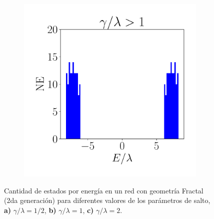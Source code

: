 \begin{figure}[h!]
\begin{subfigure}[b!]{0.3 \textwidth}
         \label{}
     \end{subfigure}\hspace*{1em}
     \begin{subfigure}[b!]{0.3 \textwidth}
         \caption{}
         \includegraphics[width=\textwidth]{Imagenes/Resultados_Hoti_Fractal/bars_square3.pdf}
         \label{}
     \end{subfigure}\hspace*{1em}\vspace*{-1.5em}
        \caption{Cantidad de estados por energía en un red con geometría Fractal (2da generación) para diferentes valores de los parámetros de salto, \textbf{a)} $\gamma /\lambda = 1/2$, \textbf{b)} $\gamma /\lambda = 1$, \textbf{c)} $\gamma /\lambda = 2$.}
    \label{fig:Dos_fractal}
\end{figure}